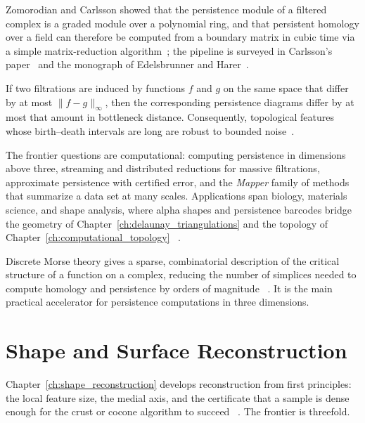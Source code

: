 Zomorodian and Carlsson showed that the persistence module of a filtered
complex is a graded module over a polynomial ring, and that persistent homology
over a field can therefore be computed from a boundary matrix in cubic time via
a simple matrix-reduction algorithm~\cite{zomorodian2005}; the pipeline is
surveyed in Carlsson's paper~\cite{carlsson2009} and the monograph of
Edelsbrunner and Harer~\cite{edelsbrunnerharer2010}.

\begin{theorem}\label{thm:frontiers_stability}
If two filtrations are induced by functions $f$ and $g$ on the same space that
differ by at most $\|f - g\|_\infty$, then the corresponding persistence
diagrams differ by at most that amount in bottleneck distance. Consequently,
topological features whose birth--death intervals are long are robust to
bounded noise~\cite{edelsbrunnerharer2010,carlsson2009}.
\end{theorem}

The frontier questions are computational: computing persistence in dimensions
above three, streaming and distributed reductions for massive filtrations,
approximate persistence with certified error, and the \emph{Mapper} family of
methods that summarize a data set at many scales. Applications span biology,
materials science, and shape analysis, where alpha shapes and persistence
barcodes bridge the geometry of Chapter~\ref{ch:delaunay_triangulations} and
the topology of Chapter~\ref{ch:computational_topology}
~\cite{edelsbrunner1983alpha,dey2010}.

\begin{remark}\label{rem:frontiers_morse}
Discrete Morse theory gives a sparse, combinatorial description of the
critical structure of a function on a complex, reducing the number of simplices
needed to compute homology and persistence by orders of magnitude
~\cite{forman1998,forman2002}. It is the main practical accelerator for
persistence computations in three dimensions.
\end{remark}

\section{Shape and Surface Reconstruction}
\label{sec:frontiers_reconstruction}

Chapter~\ref{ch:shape_reconstruction} develops reconstruction from first
principles: the local feature size, the medial axis, and the certificate that a
sample is dense enough for the crust or cocone algorithm to succeed
~\cite{amenta1998,amentabern1999,dey2007}. The frontier is threefold.


